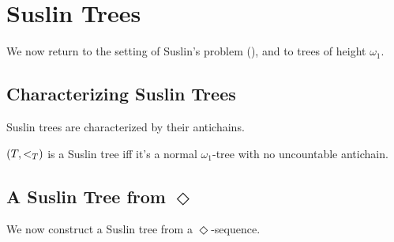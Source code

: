 \section{Suslin Trees} \label{Ch5:Sec:Suslin_Trees}

We now return to the setting of Suslin's problem (), and to trees of height $\omega_1$.

\subsection{Characterizing Suslin Trees}

\sorry

Suslin trees are characterized by their antichains.

\begin{boxlemma}
    $\left( T, <_{T} \right)$ is a Suslin tree iff it's a normal $\omega_1$-tree with no uncountable antichain.
\end{boxlemma}

\subsection{A Suslin Tree from $\Diamond$}

We now construct a Suslin tree from a $\Diamond$-sequence.

